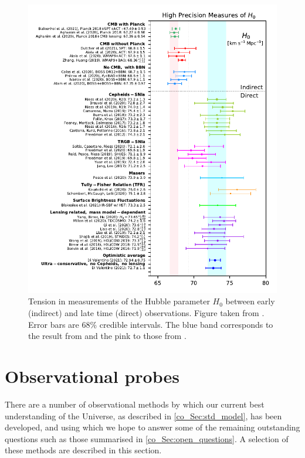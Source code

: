 \begin{figure}
\includegraphics[width=\textwidth]{h0_tension}
\caption{Tension in measurements of the Hubble parameter $H_0$ between early (indirect) and late time (direct) observations. Figure taken from \citet{DiValentino2021Hubble}. Error bars are 68\% credible intervals. The blue band corresponds to the result from \citet{Riess2020} and the pink to those from \citet{Planck2018VI}.}
\label{co_Fig:h0_tension}
\end{figure}

\section{Observational probes}
\label{co_Sec:obs_probes}

There are a number of observational methods by which our current best understanding of the Universe, as described in \autoref{co_Sec:std_model}, has been developed, and using which we hope to answer some of the remaining outstanding questions such as those summarised in \autoref{co_Sec:open_questions}. A selection of these methods are described in this section.

